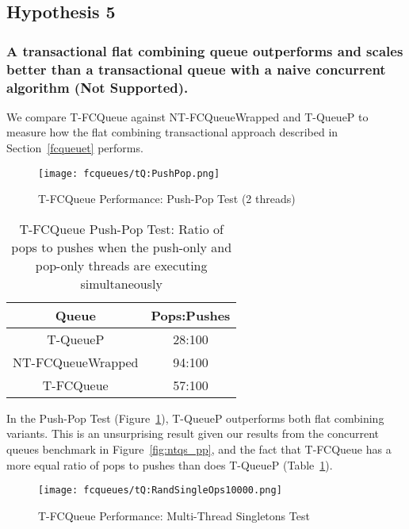 \subsection{Hypothesis 5}
\subsubsection{A transactional flat combining queue outperforms and scales better than a transactional queue with a naive concurrent algorithm (Not Supported).}
\label{eval:hypo5}

We compare T-FCQueue against NT-FCQueueWrapped and T-QueueP to measure how the flat combining transactional approach described in Section~\ref{fcqueuet} performs.

\begin{figure}[t!]
    \centering
	\begin{minipage}{0.9\textwidth}
        {\texttt{[image: fcqueues/tQ:PushPop.png]}}
	\end{minipage}
        \caption{T-FCQueue Performance: Push-Pop Test (2 threads)}
        \label{fig:tqs_pp}
\end{figure}

\begin{table}[t!]
        \centering
    \begin{tabular}{|cc|}
        \hline
        Queue & Pops:Pushes\\
        \hline
            T-QueueP & 28:100\\
            NT-FCQueueWrapped & 94:100\\
            T-FCQueue & 57:100\\
        \hline
    \end{tabular}
    \caption{T-FCQueue Push-Pop Test: Ratio of pops to pushes when the push-only and pop-only threads are executing simultaneously}
    \label{tab:tfc_pop_push_ratio}
\end{table}

In the Push-Pop Test (Figure~\ref{fig:tqs_pp}), T-QueueP outperforms both flat combining variants. This is an unsurprising result given our results from the concurrent queues benchmark in Figure~\ref{fig:ntqs_pp}, and the fact that T-FCQueue has a more equal ratio of pops to pushes than does T-QueueP (Table~\ref{tab:tfc_pop_push_ratio}). 

\begin{figure}[t!]
    \centering
   	\begin{minipage}{0.9\textwidth}
        {\texttt{[image: fcqueues/tQ:RandSingleOps10000.png]}}
	\end{minipage}
    \caption{T-FCQueue Performance: Multi-Thread Singletons Test}
    \label{fig:tqs}
\end{figure}

